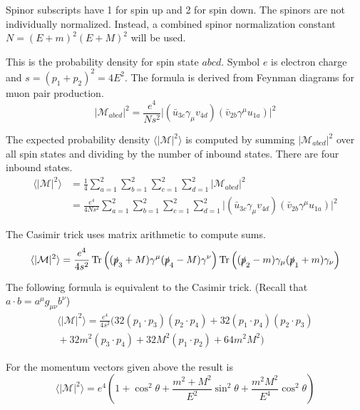 \documentclass[12pt]{article}
\begin{document}
Spinor subscripts have 1 for spin up and 2 for spin down.
The spinors are not individually normalized.
Instead, a combined spinor normalization constant $N=(E+m)^2(E+M)^2$ will be used.

\bigskip
This is the probability density for spin state $abcd$.
Symbol $e$ is electron charge and $s=(p_1+p_2)^2=4E^2$.
The formula is derived from Feynman diagrams for muon pair production.
\begin{equation*}
\big|\mathcal{M}_{abcd}\big|^2
=\frac{e^4}{Ns^2}\big|(\bar{u}_{3c}\gamma_\mu v_{4d})(\bar{v}_{2b}\gamma^\mu u_{1a})\big|^2
\end{equation*}

The expected probability density $\langle|\mathcal{M}|^2\rangle$
is computed by summing $|\mathcal{M}_{abcd}|^2$ over all spin states
and dividing by the number of inbound states.
There are four inbound states.
\begin{align*}
\langle|\mathcal{M}|^2\rangle
&=\frac{1}{4}\sum_{a=1}^2\sum_{b=1}^2\sum_{c=1}^2\sum_{d=1}^2\big|\mathcal{M}_{abcd}\big|^2
\\
&=\frac{e^4}{4Ns^2}\sum_{a=1}^2\sum_{b=1}^2\sum_{c=1}^2\sum_{d=1}^2
\big|(\bar{u}_{3c}\gamma_\mu v_{4d})(\bar{v}_{2b}\gamma^\mu u_{1a})\big|^2
\end{align*}

The Casimir trick uses matrix arithmetic to compute sums.
\begin{equation*}
\langle|\mathcal{M}|^2\rangle
=\frac{e^4}{4s^2}
\mathop{\rm Tr}\left((\slashed{p}_3+M)\gamma^\mu(\slashed{p}_4-M)\gamma^\nu\right)
\mathop{\rm Tr}\left((\slashed{p}_2-m)\gamma_\mu(\slashed{p}_1+m)\gamma_\nu\right)
\end{equation*}

The following formula is equivalent to the Casimir trick.
(Recall that $a\cdot b=a^\mu g_{\mu\nu}b^\nu$)
\begin{multline*}
\langle|\mathcal{M}|^2\rangle
=\frac{e^4}{4s^2}
\bigg(
32 (p_1\cdot p_3) (p_2\cdot p_4) +
32 (p_1\cdot p_4) (p_2\cdot p_3)
\\
{}+32 m^2 (p_3\cdot p_4) +
32 M^2 (p_1\cdot p_2) +
64 m^2 M^2
\bigg)
\end{multline*}

For the momentum vectors given above the result is
\begin{equation*}
\langle|\mathcal{M}|^2\rangle
=e^4\left(1+\cos^2\theta+\frac{m^2+M^2}{E^2}\sin^2\theta+\frac{m^2M^2}{E^4}\cos^2\theta\right)
\end{equation*}
\end{document}
